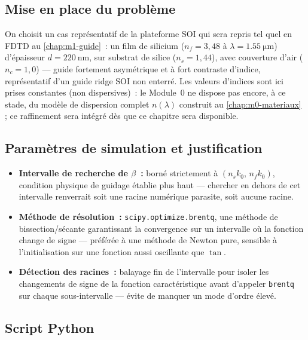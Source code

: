 \subsection{Mise en place du problème}

On choisit un cas représentatif de la plateforme SOI qui sera repris tel
quel en FDTD au \cref{chap:m1-guide}~: un film de silicium
($n_f = 3{,}48$ à $\lambda = \SI{1.55}{\micro\metre}$) d'épaisseur
$d = \SI{220}{\nano\metre}$, sur substrat de silice ($n_s = 1{,}44$), avec
couverture d'air ($n_c = 1{,}0$) — guide fortement asymétrique et à fort
contraste d'indice, représentatif d'un guide ridge SOI non enterré. Les
valeurs d'indices sont ici prises constantes (non dispersives)~: le
Module~0 ne dispose pas encore, à ce stade, du modèle de dispersion complet
$n(\lambda)$ construit au \cref{chap:m0-materiaux} ; ce raffinement sera
intégré dès que ce chapitre sera disponible.

\subsection{Paramètres de simulation et justification}

\begin{itemize}[leftmargin=1.4em]
  \item \textbf{Intervalle de recherche de $\beta$~:} borné strictement à
    $(n_s k_0,\, n_f k_0)$, condition physique de guidage établie plus haut
    — chercher en dehors de cet intervalle renverrait soit une racine
    numérique parasite, soit aucune racine.
  \item \textbf{Méthode de résolution~:} \texttt{scipy.optimize.brentq},
    une méthode de bissection/sécante garantissant la convergence sur un
    intervalle où la fonction change de signe — préférée à une méthode de
    Newton pure, sensible à l'initialisation sur une fonction aussi
    oscillante que $\tan$.
  \item \textbf{Détection des racines~:} balayage fin de l'intervalle pour
    isoler les changements de signe de la fonction caractéristique avant
    d'appeler \texttt{brentq} sur chaque sous-intervalle — évite de manquer
    un mode d'ordre élevé.
\end{itemize}

\subsection{Script Python}

